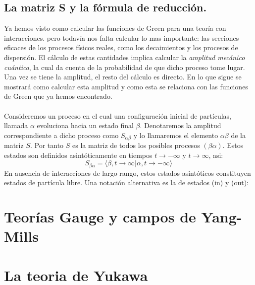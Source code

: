 \subsection{La matriz S y la fórmula de reducción.}
Ya hemos visto como calcular las funciones de Green para una teoría con interacciones. pero todavía nos falta calcular lo mas importante: las secciones eficaces de los procesos físicos reales, como los decaimientos y los procesos de dispersión. El cálculo de estas cantidades implica calcular la \textit{amplitud mecánico cuántica}, la cual da cuenta de la probabilidad de que dicho proceso tome lugar. Una vez se tiene la amplitud, el resto del cálculo es directo. En lo que sigue se mostrará como calcular esta amplitud y como esta se relaciona con las funciones de Green que ya hemos encontrado.
\\
\\
Consideremos un proceso en el cual una configuración inicial de partículas, llamada $\alpha$ evoluciona hacia un estado final $\beta$. Denotaremos la amplitud correspondiente a dicho proceso como $S_{\alpha\beta}$ y lo llamaremos el elemento $\alpha\beta$ de la matriz $S$. Por tanto $S$ es la matriz de todos los posibles procesos $(\beta\alpha)$. Estos estados son definidos asintóticamente en tiempos $t\to -\infty$ y $t\to \infty$, asi:
\begin{equation}
S_{\beta\alpha}=\langle \beta,t\to\infty|\alpha,t\to -\infty\rangle
\end{equation} 
En ausencia de interacciones de largo rango, estos estados asintóticos constituyen estados de partícula libre. Una notación alternativa es la de estados (in) y (out):







\section{Teorías Gauge y campos de Yang-Mills}
\section{La teoria de Yukawa}